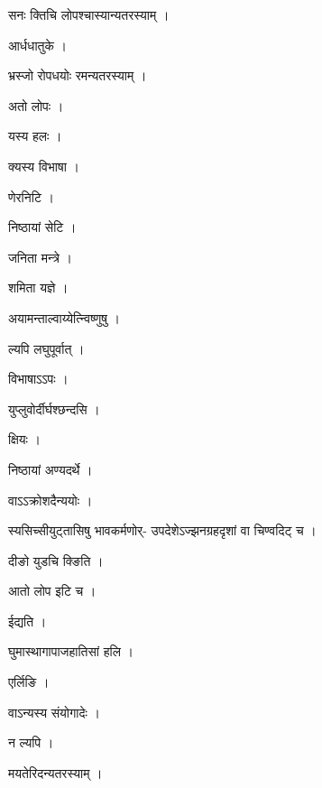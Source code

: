 \documentclass[10pt, openany]{book}
\begin{document}
\noindent सनः क्तिचि लोपश्चास्यान्यतरस्याम् ।

\noindent आर्धधातुके ।

\noindent भ्रस्जो रोपधयोः रमन्यतरस्याम् ।

\noindent अतो लोपः ।

\noindent यस्य हलः ।

\noindent क्यस्य विभाषा ।

\noindent णेरनिटि ।

\noindent निष्ठायां सेटि ।

\noindent जनिता मन्त्रे ।

\noindent शमिता यज्ञे ।

\noindent अयामन्ताल्वाय्येत्न्विष्णुषु ।

\noindent ल्यपि लघुपूर्वात् ।

\noindent विभाषाऽऽपः ।

\noindent युप्लुवोर्दीर्घश्छन्दसि ।

\noindent क्षियः ।

\noindent निष्ठायां अण्यदर्थे ।

\noindent वाऽऽक्रोशदैन्ययोः ।

\noindent स्यसिच्सीयुट्तासिषु भावकर्मणोर्- उपदेशेऽज्झनग्रहदृशां वा चिण्वदिट् च ।

\noindent दीङो युडचि क्ङिति ।

\noindent आतो लोप इटि च ।

\noindent ईद्यति ।

\noindent घुमास्थागापाजहातिसां हलि ।

\noindent एर्लिङि ।

\noindent वाऽन्यस्य संयोगादेः ।

\noindent न ल्यपि ।

\noindent मयतेरिदन्यतरस्याम् ।
\end{document}
